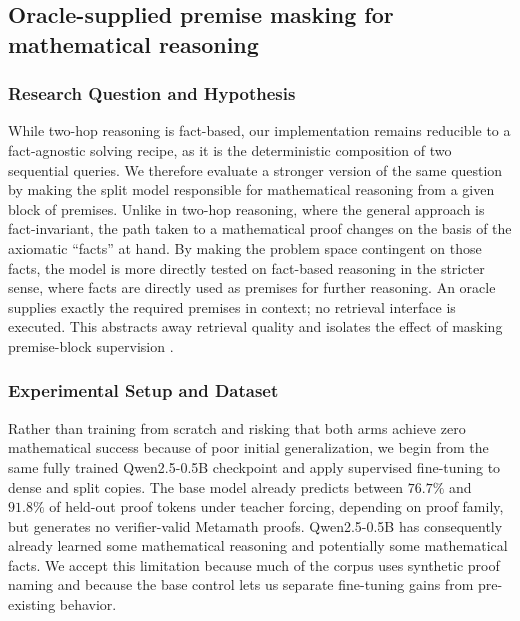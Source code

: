 \documentclass{article}
\begin{document}
\FloatBarrier
\subsection{Oracle-supplied premise masking for mathematical reasoning}
\label{sec:math-proof-reasoning}

\subsubsection{Research Question and Hypothesis}

While two-hop reasoning is fact-based, our implementation remains reducible to a fact-agnostic solving recipe, as it is the deterministic composition of two sequential queries. We therefore evaluate a stronger version of the same question by making the split model responsible for mathematical reasoning from a given block of premises. Unlike in two-hop reasoning, where the general approach is fact-invariant, the path taken to a mathematical proof changes on the basis of the axiomatic ``facts'' at hand. By making the problem space contingent on those facts, the model is more directly tested on fact-based reasoning in the stricter sense, where facts are directly used as premises for further reasoning. An oracle supplies exactly the required premises in context; no retrieval interface is executed. This abstracts away retrieval quality and isolates the effect of masking premise-block supervision \citep{zhao2025lmlm,feldman2026colmlm}.

\subsubsection{Experimental Setup and Dataset}

Rather than training from scratch and risking that both arms achieve zero mathematical success because of poor initial generalization, we begin from the same fully trained Qwen2.5-0.5B checkpoint and apply supervised fine-tuning to dense and split copies. The base model already predicts between $76.7\%$ and $91.8\%$ of held-out proof tokens under teacher forcing, depending on proof family, but generates no verifier-valid Metamath proofs. Qwen2.5-0.5B has consequently already learned some mathematical reasoning and potentially some mathematical facts. We accept this limitation because much of the corpus uses synthetic proof naming and because the base control lets us separate fine-tuning gains from pre-existing behavior.
\end{document}
